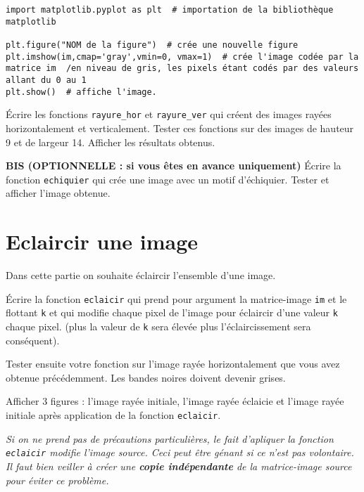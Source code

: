 \begin{lstlisting}
import matplotlib.pyplot as plt  # importation de la bibliothèque matplotlib

plt.figure("NOM de la figure")  # crée une nouvelle figure
plt.imshow(im,cmap='gray',vmin=0, vmax=1)  # crée l'image codée par la matrice im  /en niveau de gris, les pixels étant codés par des valeurs allant du 0 au 1 
plt.show() 	# affiche l'image. 
\end{lstlisting}


\begin{question}
\'Ecrire les fonctions \lstinline{rayure_hor} et \lstinline{rayure_ver} qui créent des images rayées horizontalement et verticalement. Tester ces fonctions sur des images de hauteur 9 et de largeur 14. Afficher les résultats obtenus.
\end{question}


\begin{question}
\textbf{BIS (OPTIONNELLE : si vous êtes en avance uniquement)} \'Ecrire la fonction \lstinline{echiquier} qui crée une image avec un motif d'échiquier. Tester et afficher l'image obtenue.
\end{question}


\section*{Eclaircir une image}
Dans cette partie on souhaite éclaircir l'ensemble d'une image.

\begin{question}
\'Ecrire la fonction \lstinline{eclaicir} qui prend pour argument la matrice-image \lstinline{im} et le flottant \lstinline{k} et qui modifie chaque pixel de l'image pour éclaircir d'une valeur \lstinline{k} chaque pixel. (plus la valeur de \lstinline{k} sera élevée plus l'éclaircissement sera conséquent).

Tester ensuite votre fonction sur l'image rayée horizontalement que vous avez obtenue précédemment. Les bandes noires doivent devenir grises. 

Afficher 3 figures : l'image rayée initiale, l'image rayée éclaicie et l'image rayée initiale après application de la fonction \lstinline{eclaicir}.  
\end{question}


\textit{Si on ne prend pas de précautions particulières, le fait d'apliquer la fonction \lstinline{eclaicir} modifie l'image source. Ceci peut être génant si ce n'est pas volontaire. Il faut bien veiller à créer une \textbf{copie indépendante} de la matrice-image source pour éviter ce problème.}


